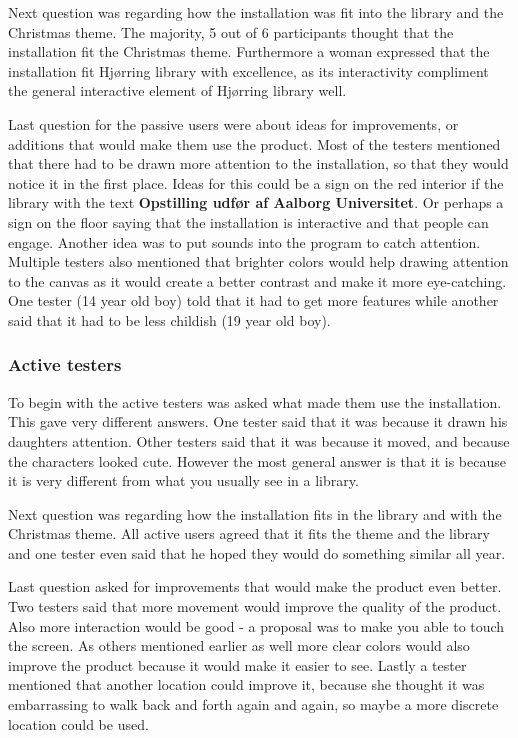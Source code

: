 Next question was regarding how the installation was fit into the library and the Christmas theme. The majority, 5 out of 6 participants thought that the installation fit the Christmas theme. Furthermore a woman expressed that the installation fit Hj{\o}rring library with excellence, as its interactivity compliment the general interactive element of Hj{\o}rring library well. 

Last question for the passive users were about ideas for improvements, or additions that would make them use the product.
Most of the testers mentioned that there had to be drawn more attention to the installation, so that they would notice it in the first place. Ideas for this could be a sign on the red interior if the library with the text \textbf{Opstilling udfør af Aalborg Universitet}. Or perhaps a sign on the floor saying that the installation is interactive and that people can engage. Another idea was to put sounds into the program to catch attention. Multiple testers also mentioned that brighter colors would help drawing attention to the canvas as it would create a better contrast and make it more eye-catching. 
One tester (14 year old boy) told that it had to get more features while another said that it had to be less childish (19 year old boy).

\subsubsection{Active testers}
To begin with the active testers was asked what made them use the installation. This gave very different answers. One tester said that it was because it drawn his daughters attention. Other testers said that it was because it moved, and because the characters looked cute. However the most general answer is that it is because it is very different from what you usually see in a library.

Next question was regarding how the installation fits in the library and with the Christmas theme. All active users agreed that it fits the theme and the library and one tester even said that he hoped they would do something similar all year.

Last question asked for improvements that would make the product even better. Two testers said that more movement would improve the quality of the product. Also more interaction would be good - a proposal was to make you able to touch the screen.
As others mentioned earlier as well more clear colors would also improve the product because it would make it easier to see. Lastly a tester mentioned that another location could improve it, because she thought it was embarrassing to walk back and forth again and again, so maybe a more discrete location could be used.

